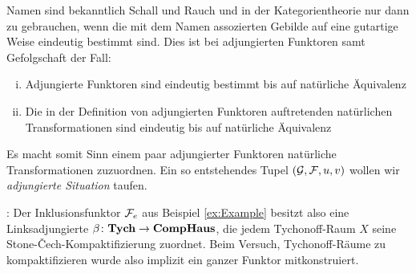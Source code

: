 \begin{bem}
  Namen sind bekanntlich Schall und Rauch und in der Kategorientheorie nur dann zu gebrauchen, wenn die mit dem Namen assozierten Gebilde auf eine gutartige Weise eindeutig bestimmt sind.
  Dies ist bei adjungierten Funktoren samt Gefolgschaft der Fall:
  \begin{enumerate}[(i)]
    \item Adjungierte Funktoren sind eindeutig bestimmt bis auf natürliche Äquivalenz
    \item Die in der Definition von adjungierten Funktoren auftretenden natürlichen Transformationen sind eindeutig bis auf natürliche Äquivalenz
  \end{enumerate}
  Es macht somit Sinn einem paar adjungierter Funktoren natürliche Transformationen zuzuordnen. Ein so entstehendes Tupel $(\mathcal{G}, \mathcal{F}, u, v)$ wollen wir \emph{adjungierte Situation} taufen.
\end{bem}

\begin{ex}: Der Inklusionsfunktor $\mathcal{F}_e$ aus Beispiel \ref{ex:Example} besitzt also eine Linksadjungierte $\beta \colon \mathbf{Tych} \to \mathbf{CompHaus}$, die jedem Tychonoff-Raum $X$ seine Stone-\v{C}ech-Kompaktifizierung zuordnet. Beim Versuch, Tychonoff-Räume zu kompaktifizieren wurde also implizit ein ganzer Funktor mitkonstruiert.
\end{ex}


